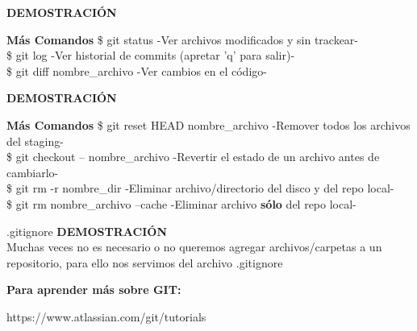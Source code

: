 \documentclass{beamer}
\begin{document}
	\begin{frame}
		\textbf{DEMOSTRACIÓN} 
		\begin{block}{\textbf{Más Comandos}}
			\vspace{0.3cm}
			 \$ git status   \small -Ver archivos modificados y sin trackear- \\
			\vspace{0.3cm}
			 \$ git log    \small -Ver historial de commits (apretar 'q' para salir)-\\
			\vspace{0.3cm}
		    \$ git diff nombre\_archivo    \small -Ver cambios en el código-\\
			\vspace{0.3cm}
		\end{block}	
	\end{frame}

	\begin{frame}
	\textbf{DEMOSTRACIÓN} 
		\begin{block}{\textbf{Más Comandos}}
			\vspace{0.3cm}
			\small \$ git reset HEAD nombre\_archivo   \tiny -Remover todos los archivos del staging- \\
			\vspace{0.3cm}
			\small \$ git checkout -- nombre\_archivo \tiny -Revertir el estado de un archivo antes de cambiarlo-\\
			\vspace{0.3cm}
			\small \$ git rm -r nombre\_dir   \tiny -Eliminar archivo/directorio del disco y del repo local-\\
			\vspace{0.3cm}
			\small \$ git rm nombre\_archivo --cache   \tiny -Eliminar archivo \textbf{sólo} del repo local-\\
			\vspace{0.3cm}
		\end{block}	
	\end{frame}

	\begin{frame}{.gitignore}
		\textbf{DEMOSTRACIÓN} \\
		\vspace{.5cm}
		Muchas veces no es necesario o no queremos agregar archivos/carpetas a un repositorio, para ello nos servimos del archivo .gitignore
	\end{frame}

	\begin{frame}
		\textbf{Para aprender más sobre GIT:} \\
		\vspace{1cm}
		\begin{center}
			https://www.atlassian.com/git/tutorials
		\end{center}

	\end{frame}
\end{document}
